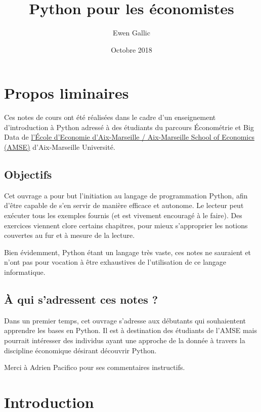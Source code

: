 \documentclass[12pt,]{book}
\title{Python pour les économistes}
\author{Ewen Gallic}
\date{Octobre 2018}
\numberwithin{equation}{section}
\numberwithin{countremarque}{section}
\newcounter{exercices}[section]
\begin{document}
\maketitle

{
\hypersetup{linkcolor=black}
\setcounter{tocdepth}{2}
\tableofcontents
}
\listoftables
\listoffigures
\chapter*{Propos liminaires}\label{propos-liminaires}

Ces notes de cours ont été réalisées dans le cadre d'un enseignement
d'introduction à Python adressé à des étudiants du parcours Économétrie
et Big Data de \href{https://www.amse-aixmarseille.fr/}{l'École
d'Economie d'Aix-Marseille / Aix-Marseille School of Economics (AMSE)}
d'Aix-Marseille Université.

\section{Objectifs}\label{objectifs}

Cet ouvrage a pour but l'initiation au langage de programmation Python,
afin d'être capable de s'en servir de manière efficace et autonome. Le
lecteur peut exécuter tous les exemples fournis (et est vivement
encouragé à le faire). Des exercices viennent clore certains chapitres,
pour mieux s'approprier les notions couvertes au fur et à mesure de la
lecture.

Bien évidemment, Python étant un langage très vaste, ces notes ne
sauraient et n'ont pas pour vocation à être exhaustives de l'utilisation
de ce langage informatique.

\section{À qui s'adressent ces notes
?}\label{a-qui-sadressent-ces-notes}

Dans un premier temps, cet ouvrage s'adresse aux débutants qui
souhaientent apprendre les bases en Python. Il est à destination des
étudiants de l'AMSE mais pourrait intéresser des individus ayant une
approche de la donnée à travers la discipline économique désirant
découvrir Python.

Merci à Adrien Pacifico pour ses commentaires instructifs.

\chapter{Introduction}\label{introduction}
\end{document}
